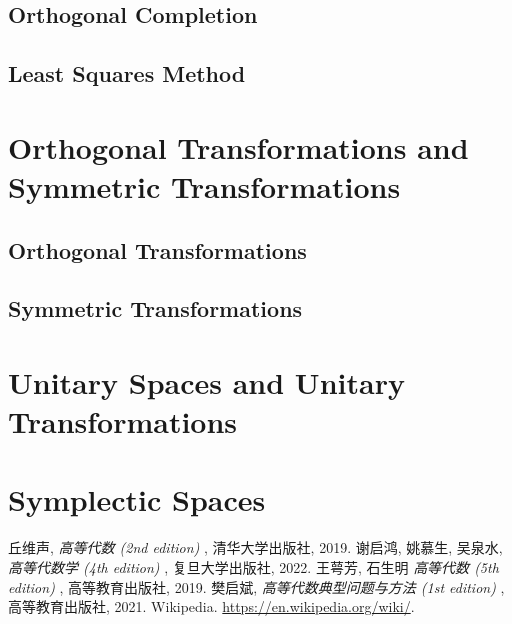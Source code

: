 \documentclass[11pt]{../../TexTemplate/elegantbook} %
\begin{document}
\subsection{Orthogonal Completion}

\subsection{Least Squares Method}

\section{Orthogonal Transformations and Symmetric Transformations}
\subsection{Orthogonal Transformations}

\subsection{Symmetric Transformations}

\section{Unitary Spaces and Unitary Transformations}

\section{Symplectic Spaces}

\begin{thebibliography}{99} 
 丘维声, \emph{ 高等代数 (2nd edition) }, 清华大学出版社, 2019. 
 谢启鸿, 姚慕生, 吴泉水, \emph{ 高等代数学 (4th edition) }, 复旦大学出版社, 2022.
 王萼芳, 石生明 \emph{ 高等代数 (5th edition) }, 高等教育出版社, 2019.
 樊启斌, \emph{ 高等代数典型问题与方法 (1st edition) }, 高等教育出版社, 2021.
 Wikipedia. \url{https://en.wikipedia.org/wiki/}.
\end{thebibliography}
\end{document}
